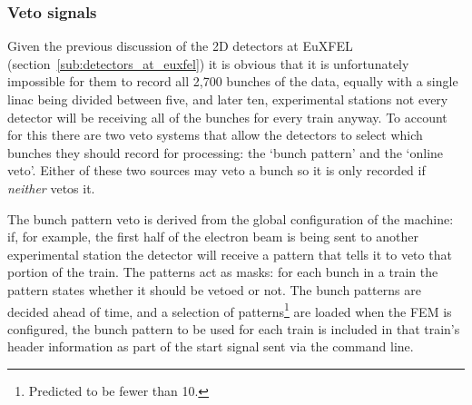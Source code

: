 \subsubsection{Veto signals} %
\label{sub:veto_signal}
Given the previous discussion of the 2D detectors at EuXFEL (section~\ref{sub:detectors_at_euxfel}) it is obvious that it is unfortunately impossible for them to record all 2,700 bunches of the data, equally with a single linac being divided between five, and later ten, experimental stations not every detector will be receiving all of the bunches for every train anyway. To account for this there are two veto systems that allow the detectors to select which bunches they should record for processing: the `bunch pattern' and the `online veto'. Either of these two sources may veto a bunch so it is only recorded if \emph{neither} vetos it. 

The bunch pattern veto is derived from the global configuration of the machine: if, for example, the first half of the electron beam is being sent to another experimental station the detector will receive a pattern that tells it to veto that portion of the train. The patterns act as masks: for each bunch in a train the pattern states whether it should be vetoed or not. The bunch patterns are decided ahead of time, and a selection of patterns\footnote{Predicted to be fewer than 10.} are loaded when the FEM is configured, the bunch pattern to be used for each train is included in that train's header information as part of the start signal sent via the command line.

